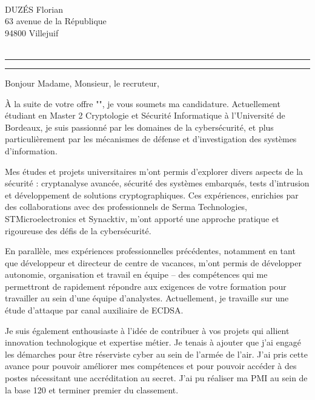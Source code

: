 \begin{large}


\hfill \entreprise \\
DUZÉS Florian  \hfill \adresse\\
63 avenue de la République\hfill \adresseVille \\
94800 Villejuif \\
\phonenumber \\
\mail

\medbreak\medbreak

 
   
\vspace{8pt}
{\color{accentLine} \hrule}
\begin{center}
    {\Large\color{accentTitle} \stagename}
\end{center}
{\color{accentLine} \hrule}
\vspace{8pt}


\begin{justify}
Bonjour Madame, Monsieur, le recruteur,\medbreak

À la suite de votre offre "\stagename", je vous soumets ma candidature. Actuellement étudiant en Master 2 Cryptologie et Sécurité Informatique à l’Université de Bordeaux, je suis passionné par les domaines de la cybersécurité, et plus particulièrement par les mécanismes de défense et d’investigation des systèmes d’information.\medbreak 

Mes études et projets universitaires m’ont permis d’explorer divers aspects de la sécurité : cryptanalyse avancée, sécurité des systèmes embarqués, tests d’intrusion et développement de solutions cryptographiques. Ces expériences, enrichies par des collaborations avec des  professionnels de Serma Technologies, STMicroelectronics et Synacktiv, m’ont apporté une approche pratique et rigoureuse des défis de la cybersécurité.\medbreak 

En parallèle, mes expériences professionnelles précédentes, notamment en tant que développeur et directeur de centre de vacances, m’ont permis de développer autonomie, organisation et travail en équipe – des compétences qui me permettront de rapidement répondre aux exigences de votre formation pour travailler au sein d'une équipe d'analystes. Actuellement, je travaille sur une étude d'attaque par canal auxiliaire de ECDSA.\medbreak 

Je suis également enthousiaste à l’idée de contribuer à vos projets qui allient innovation technologique et expertise métier. Je tenais à ajouter que j'ai engagé les démarches pour être réserviste cyber au sein de l'armée de l'air. J'ai pris cette avance pour pouvoir améliorer mes compétences et pour pouvoir accéder à des postes nécessitant une accréditation au secret. J'ai pu réaliser ma PMI au sein de la base 120 et terminer premier du classement.\medbreak 


\end{justify}
\end{large}
